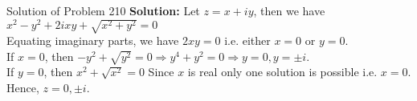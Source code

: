 \documentclass[aspectratio=169,8pt]{beamer}
\begin{document}
\begin{frame}{Solution of Problem 210}
  \textbf{Solution:} Let $z = x + iy$, then we have $x^2 - y^2 + 2ixy + \sqrt{x^2 + y^2} = 0$
  \\\vspace*{0.2cm}
  Equating imaginary parts, we have $2xy = 0$ i.e. either $x = 0$ or $y = 0$.
  \\\vspace*{0.2cm}
  If $x = 0$, then $-y^2 + \sqrt{y^2} = 0 \Rightarrow y^4 + y^2 = 0 \Rightarrow y = 0, y = \pm i$.
  \\\vspace*{0.2cm}
  If $y = 0$, then $x^2 + \sqrt{x^2} = 0$ Since $x$ is real only one solution is possible i.e. $x = 0$.
  \\\vspace*{0.2cm}
  Hence, $z = 0, \pm i$.
\end{frame}
\end{document}
